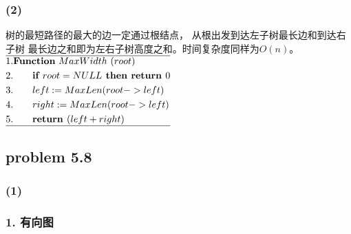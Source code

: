 \documentclass[11pt,a4paper,oneside,oldfontcommands]{ctexart}
\begin{document}
\subsubsection*{(2)}
\noindent 树的最短路径的最大的边一定通过根结点，
从根出发到达左子树最长边和到达右子树
最长边之和即为左右子树高度之和。时间复杂度同样为$O(n)$。\\
$
	\begin{aligned}
		\hline
		 & 1.\textbf{Function}\ {MaxWidth}\ (root)                      \\
		 & 2.\hspace*{20pt}\textbf{if }root=NULL\textbf{ then return }0 \\
		 & 3.\hspace*{20pt}left:=MaxLen(root->left)                     \\
		 & 4.\hspace*{20pt}right:=MaxLen(root->left)                    \\
		 & 5.\hspace*{20pt}\textbf{return }(left+right)                 \\
		\hline
	\end{aligned}
$
{\subsection*{problem 5.8}}
\subsubsection*{(1)}
\subsubsection*{1. 有向图}
\end{document}
